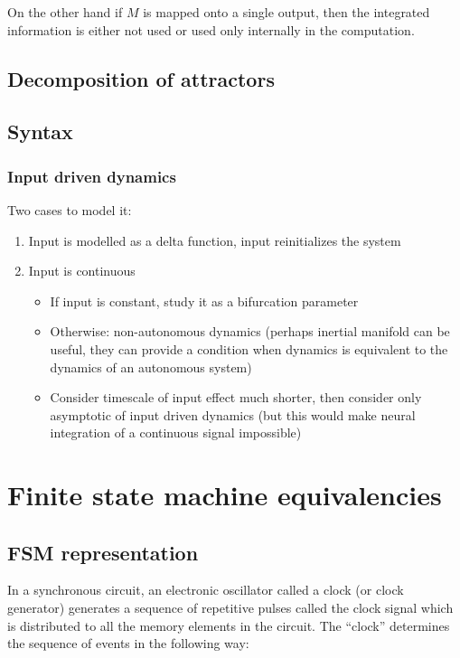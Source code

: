 \documentclass{scrartcl}
\theoremstyle{definition}
\theoremstyle{remark}
\begin{document}
On the other hand if $M$ is  mapped onto a single output, then the integrated information is either not used or used only internally in the computation.



\subsection{Decomposition of attractors}



\subsection{Syntax}%

\subsubsection{Input driven dynamics}
Two cases to model it:
\begin{enumerate}
\item Input is modelled as a delta function, input reinitializes the system
\item Input is continuous 
\begin{itemize}
\item If input is constant, study it as a bifurcation parameter
\item Otherwise: non-autonomous dynamics (perhaps inertial manifold can be useful, they can provide a condition when dynamics is equivalent to the dynamics of an autonomous system)
\item Consider timescale of input effect much shorter, then consider only asymptotic of input driven dynamics (but this would make neural integration of a continuous signal impossible)
\end{itemize}
\end{enumerate}


\section{Finite state machine equivalencies}\label{sec:fsm}

\subsection{FSM representation}
In a synchronous circuit, an electronic oscillator called a clock (or clock generator) generates a sequence of repetitive pulses called the clock signal which is distributed to all the memory elements in the circuit. 
The ``clock'' determines the sequence of events in the following way:
\end{document}
